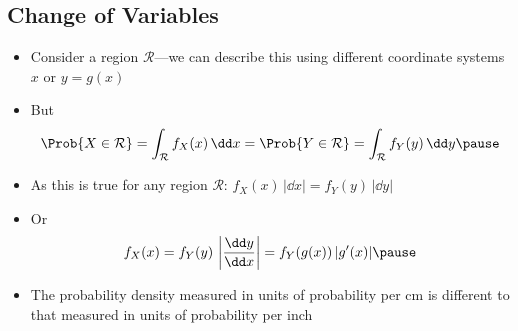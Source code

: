 
\begin{slide}
\section[-2]{Change of Variables}
  
\begin{PauseHighLight}
  \begin{itemize}
  \item Consider a region $\mathcal{R}$---we can describe this using
    different coordinate systems $x$ or $y= g(x)$\pause
  \item But
    \begin{align*}
      \Prob{X\in\mathcal{R}}
      = \int_{\mathcal{R}} f_{X}(x) \, \dd x
      =  \Prob{Y\in\mathcal{R}}
      = \int_{\mathcal{R}} f_{Y}(y) \, \dd y\pause
    \end{align*}
  \item As this is true for any region $\mathcal{R}$:
    $f_{X}(x)\, |\dd x| = f_{Y}(y) \, |\dd y|$\pause
  \item Or
    \begin{align*}
      f_{X}(x)  = f_{Y}(y) \, \left| \frac{\dd
      y}{\dd x} \right| = f_{Y}(g(x)) \, | g'(x) |
      \pause
    \end{align*}
  \item The probability density measured in units of probability per
    cm is different to that measured in units of probability per
    inch\pause 
  \end{itemize}
\end{PauseHighLight}

\end{slide}


